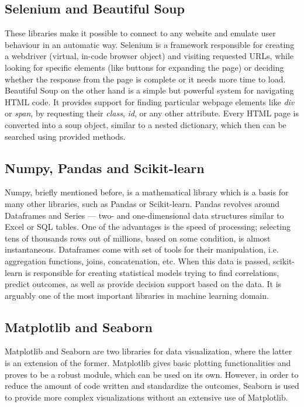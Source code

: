 \subsection{Selenium and Beautiful Soup}
These libraries make it possible to connect to any website and emulate user behaviour in an automatic way. Selenium is a framework responsible for creating a webdriver (virtual, in-code browser object) and visiting requested URLs, while looking for specific elements (like buttons for expanding the page) or deciding whether the response from the page is complete or it needs more time to load. Beautiful Soup on the other hand is a simple but powerful system for navigating HTML code. It provides support for finding particular webpage elements like \textit{div} or \textit{span}, by requesting their \textit{class}, \textit{id}, or any other attribute. Every HTML page is converted into a soup object, similar to a nested dictionary, which then can be searched using provided methods.

\subsection{Numpy, Pandas and Scikit-learn}
Numpy, briefly mentioned before, is a mathematical library which is a basis for many other libraries, such as Pandas or Scikit-learn. Pandas revolves around Dataframes and Series --- two- and one-dimensional data structures similar to Excel or SQL tables. One of the advantages is the speed of processing; selecting tens of thousands rows out of millions, based on some condition, is almost instantaneous. Dataframes come with set of tools for their manipulation, i.e. aggregation functions, joins, concatenation, etc. When this data is passed, scikit-learn is responsible for creating statistical models trying to find correlations, predict outcomes, as well as provide decision support based on the data. It is arguably one of the most important libraries in machine learning domain.

\subsection{Matplotlib and Seaborn}
Matplotlib and Seaborn are two libraries for data visualization, where the latter is an extension of the former. Matplotlib gives basic plotting functionalities and proves to be a robust module, which can be used on its own. However, in order to reduce the amount of code written and standardize the outcomes, Seaborn is used to provide more complex visualizations without an extensive use of Matplotlib.



